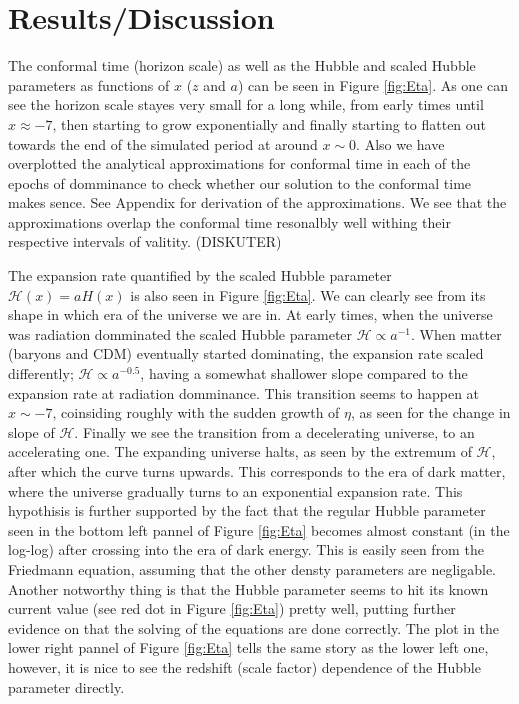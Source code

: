 \documentclass[twocolumn]{aastex62}
\begin{document}
\section{Results/Discussion}\label{sec:Results}
The conformal time (horizon scale) as well as the Hubble
and scaled Hubble parameters as functions of $x$ ($z$ and $a$) can be seen in
Figure \ref{fig:Eta}. As one can see the horizon scale stayes very small for a
long while, from early times until $x \approx -7$, then starting to grow
exponentially and finally starting to flatten out towards the end of the
simulated period at around $x\sim 0$. Also we have overplotted the analytical approximations for
conformal time in each of the epochs of domminance to check whether our solution
to the conformal time makes sence. See Appendix for derivation of the
approximations. We see that the approximations overlap the conformal time
resonalbly well withing their respective intervals of valitity. 
(DISKUTER)

The expansion rate quantified by the scaled Hubble parameter $\mathcal{H}(x) =
aH(x)$ is also seen in Figure \ref{fig:Eta}. We can clearly see from its shape
in which era of the universe we are in. At early times, when the universe was
radiation domminated the scaled Hubble parameter $\mathcal{H} \propto a^{-1}$.
When matter (baryons and CDM) eventually started dominating, the expansion rate
scaled differently; $\mathcal{H}\propto a^{-0.5}$, having a somewhat shallower
slope compared to the expansion rate at radiation domminance. This transition
seems to happen at $x\sim -7$, coinsiding roughly with the sudden growth of
$\eta$, as seen for the change in slope of $\mathcal{H}$. Finally we see the
transition from a decelerating universe, to an accelerating one. The expanding
universe halts, as seen by the extremum of $\mathcal{H}$, after which the curve
turns upwards. This corresponds to the era of dark matter, where the universe
gradually turns to an exponential expansion rate. This hypothisis is further
supported by the fact that the regular Hubble parameter seen in the bottom left
pannel of Figure \ref{fig:Eta} becomes almost constant (in the log-log) after
crossing into the era of dark energy. This is easily seen from the Friedmann
equation, assuming that the other densty parameters are negligable. Another
notworthy thing is that the Hubble parameter seems to hit its known current
value (see red dot in Figure \ref{fig:Eta}) pretty well, putting further
evidence on that the solving of the equations are done correctly. The plot in the lower right
pannel of Figure \ref{fig:Eta} tells the same story as the lower left one,
however, it is nice to see the redshift (scale factor) dependence of the Hubble
parameter directly.
\end{document}
